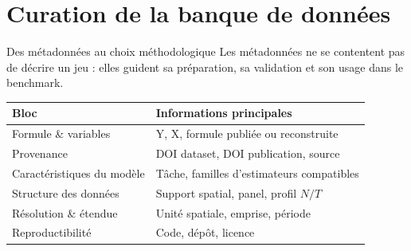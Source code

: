 \documentclass[aspectratio=169,11pt]{beamer}
\begin{document}
\section{Curation de la banque de données}
\begin{frame}{Des métadonnées au choix méthodologique}
\small
Les métadonnées ne se contentent pas de décrire un jeu : elles guident sa
préparation, sa validation et son usage dans le benchmark.
\vspace{0.3cm}
\begin{center}
\end{center}
\vspace{0.3cm}
\begin{tabularx}{\textwidth}{>{\RaggedRight\arraybackslash}p{} >{\RaggedRight\arraybackslash}X}
\toprule
\textbf{Bloc} & \textbf{Informations principales} \\
\midrule
Formule \& variables & Y, X, formule publiée ou reconstruite \\
Provenance & DOI dataset, DOI publication, source \\
Caractéristiques du modèle & Tâche, familles d'estimateurs compatibles \\
Structure des données & Support spatial, panel, profil $N/T$ \\
Résolution \& étendue & Unité spatiale, emprise, période \\
Reproductibilité & Code, dépôt, licence \\
\bottomrule
\end{tabularx}
\end{frame}
\end{document}

